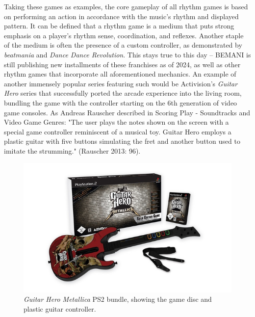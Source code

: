 Taking these games as examples, the core gameplay of all rhythm games is based on performing an action in accordance with the music's rhythm and displayed pattern. It can be defined that a rhythm game is a medium that puts strong emphasis on a player's rhythm sense, coordination, and reflexes. Another staple of the medium is often the presence of a custom controller, as demonstrated by \textit{beatmania} and \textit{Dance Dance Revolution}. This stays true to this day -- BEMANI is still publishing new installments of these franchises as of 2024, as well as other rhythm games that incorporate all aforementioned mechanics. An example of another immensely popular series featuring such would be Activision's \textit{Guitar Hero} series that successfully ported the arcade experience into the living room, bundling the game with the controller starting on the 6th generation of video game consoles. As Andreas Rauscher described in Scoring Play - Soundtracks and Video Game Genres: "The user plays the notes shown on the screen with a special game controller reminiscent of a musical toy. Guitar Hero employs a plastic guitar with five buttons simulating the fret and another button used to imitate the strumming." (Rauscher 2013: 96). \cite{MusicMedien}

\begin{figure}[h]
    \centering\includegraphics[scale=0.2]{obrazki/gh2bundle.jpg}
    \caption{\textit{Guitar Hero Metallica} PS2 bundle, showing the game disc and plastic guitar controller. \cite{gh2bundle}}
    \label{fig:gh2_bundle}
\end{figure}


